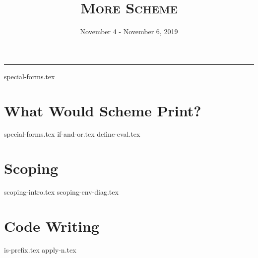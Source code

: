 \documentclass{exam}
\title{\textsc{More Scheme}}
\date{November 4 - November 6, 2019}
\begin{document}
\maketitle
\rule{\textwidth}{0.15em}
\fontsize{12}{15}\selectfont

\begin{questions}
{special-forms.tex}
\section{What Would Scheme Print?}
{special-forms.tex}
{if-and-or.tex}
{define-eval.tex}


\section{Scoping}
{scoping-intro.tex}
{scoping-env-diag.tex}


\section{Code Writing}
{is-prefix.tex}
{apply-n.tex}

\end{questions}
\end{document}
